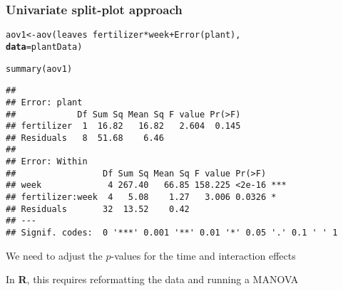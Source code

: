 \documentclass[color=usenames,dvipsnames]{beamer}\usepackage[]{graphicx}\usepackage[]{color}
\makeatletter
\newcommand{\hlopt}[1]{\textcolor[rgb]{0,0,0}{#1}}%
\newcommand{\hlstd}[1]{\textcolor[rgb]{0,0,0}{#1}}%
\newcommand{\hlkwb}[1]{\textcolor[rgb]{0,0.341,0.682}{#1}}%
\newcommand{\hlkwc}[1]{\textcolor[rgb]{0,0,0}{\textbf{#1}}}%
\newcommand{\hlkwd}[1]{\textcolor[rgb]{0.004,0.004,0.506}{#1}}%
\newenvironment{kframe}{%
 \def\at@end@of@kframe{}%
 \ifinner\ifhmode%
  \def\at@end@of@kframe{\end{minipage}}%
  \begin{minipage}{\columnwidth}%
 \fi\fi%
 \def\FrameCommand##1{\hskip\@totalleftmargin \hskip-\fboxsep
 \colorbox{shadecolor}{##1}\hskip-\fboxsep
     \hskip-\linewidth \hskip-\@totalleftmargin \hskip\columnwidth}%
 \MakeFramed {\advance\hsize-\width
   \@totalleftmargin\z@ \linewidth\hsize
   \@setminipage}}%
 {\par\unskip\endMakeFramed%
 \at@end@of@kframe}
\newenvironment{knitrout}{}{} %
\makeatother
\begin{document}



\begin{frame}[fragile]
  \frametitle{Univariate split-plot approach}
  \scriptsize
\begin{knitrout}\scriptsize
{}\color{fgcolor}\begin{kframe}
\begin{alltt}
\hlstd{aov1} \hlkwb{<-} \hlkwd{aov}\hlstd{(leaves} \hlopt{~} \hlstd{fertilizer}\hlopt{*}\hlstd{week} \hlopt{+} \hlkwd{Error}\hlstd{(plant),}
            \hlkwc{data}\hlstd{=plantData)}
\end{alltt}
\end{kframe}
\end{knitrout}
\pause
\begin{knitrout}\scriptsize
{}\color{fgcolor}\begin{kframe}
\begin{alltt}
\hlkwd{summary}\hlstd{(aov1)}
\end{alltt}
\begin{verbatim}
## 
## Error: plant
##            Df Sum Sq Mean Sq F value Pr(>F)
## fertilizer  1  16.82   16.82   2.604  0.145
## Residuals   8  51.68    6.46               
## 
## Error: Within
##                 Df Sum Sq Mean Sq F value Pr(>F)    
## week             4 267.40   66.85 158.225 <2e-16 ***
## fertilizer:week  4   5.08    1.27   3.006 0.0326 *  
## Residuals       32  13.52    0.42                   
## ---
## Signif. codes:  0 '***' 0.001 '**' 0.01 '*' 0.05 '.' 0.1 ' ' 1
\end{verbatim}
\end{kframe}
\end{knitrout}
\pause
\vfill
\footnotesize
{%
  We need to adjust the $p$-values for the time and
  interaction effects \par
  \pause
  \vfill
  In {\bf R}, this requires reformatting the data and running a MANOVA \par}
\end{frame}
\end{document}
